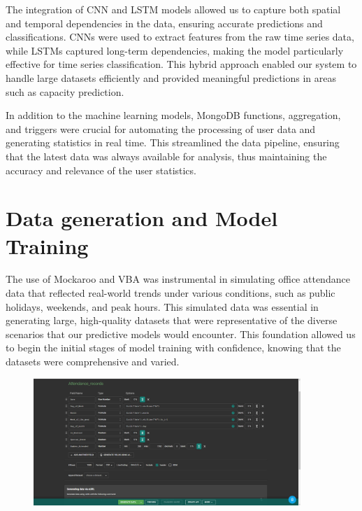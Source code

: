 \documentclass[11pt,a4paper]{article}
\begin{document}
The integration of CNN and LSTM models allowed us to capture both spatial and temporal dependencies in the data, 
ensuring accurate predictions and classifications. CNNs were used to extract features from the raw time series data, 
while LSTMs captured long-term dependencies, making the model particularly effective for time series classification. 
This hybrid approach enabled our system to handle large datasets efficiently and provided meaningful predictions in areas such as capacity prediction.

In addition to the machine learning models, MongoDB functions, aggregation, and triggers were crucial for automating the processing of user data and generating statistics in real time. 
This streamlined the data pipeline, ensuring that the latest data was always available for analysis, thus maintaining the accuracy and relevance of the user statistics.

\pagebreak

\section*{Data generation and Model Training}
The use of Mockaroo and VBA was instrumental in simulating office attendance data that reflected real-world trends under various conditions, such as public holidays, weekends, and peak hours. 
This simulated data was essential in generating large, high-quality datasets that were representative of the diverse scenarios that our predictive models would encounter. 
This foundation allowed us to begin the initial stages of model training with confidence, knowing that the datasets were comprehensive and varied.

\begin{figure}[htbp]
    \centering
    \includegraphics[width=0.9\textwidth]{Mockaroo.png}
\end{figure}
\end{document}
